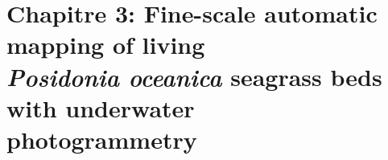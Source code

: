 \chapter[Fine-scale automatic mapping of living \textit{Posidonia oceanica} seagrass beds with underwater photogrammetry]{Chapitre 3: Fine-scale automatic mapping of living\\ \textit{Posidonia oceanica} seagrass beds with underwater\\ photogrammetry} \label{chapitre3-herbiers}

\pagestyle{main}


